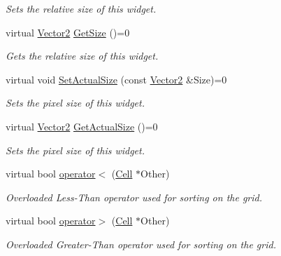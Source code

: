 \begin{DoxyCompactItemize}
\begin{DoxyCompactList}\small\item\em Sets the relative size of this widget. \item\end{DoxyCompactList}\item 
virtual \hyperlink{classphys_1_1Vector2}{Vector2} \hyperlink{classphys_1_1UI_1_1Cell_ab8288a97a63aad7cc02f32541b1b7351}{GetSize} ()=0
\begin{DoxyCompactList}\small\item\em Gets the relative size of this widget. \item\end{DoxyCompactList}\item 
virtual void \hyperlink{classphys_1_1UI_1_1Cell_a3666c40546d1e6a225421d3bfd0288f9}{SetActualSize} (const \hyperlink{classphys_1_1Vector2}{Vector2} \&Size)=0
\begin{DoxyCompactList}\small\item\em Sets the pixel size of this widget. \item\end{DoxyCompactList}\item 
virtual \hyperlink{classphys_1_1Vector2}{Vector2} \hyperlink{classphys_1_1UI_1_1Cell_a6301ce41a7a44a97de36fb54388ad430}{GetActualSize} ()=0
\begin{DoxyCompactList}\small\item\em Sets the pixel size of this widget. \item\end{DoxyCompactList}\item 
virtual bool \hyperlink{classphys_1_1UI_1_1Cell_a99be02a1d02b65f653d46e00bef0c819}{operator$<$} (\hyperlink{classphys_1_1UI_1_1Cell}{Cell} $\ast$Other)
\begin{DoxyCompactList}\small\item\em Overloaded Less-\/Than operator used for sorting on the grid. \item\end{DoxyCompactList}\item 
virtual bool \hyperlink{classphys_1_1UI_1_1Cell_ac60ff0871b40be61f51fc82e09fb8a5f}{operator$>$} (\hyperlink{classphys_1_1UI_1_1Cell}{Cell} $\ast$Other)
\begin{DoxyCompactList}\small\item\em Overloaded Greater-\/Than operator used for sorting on the grid. \item\end{DoxyCompactList}\end{DoxyCompactItemize}
